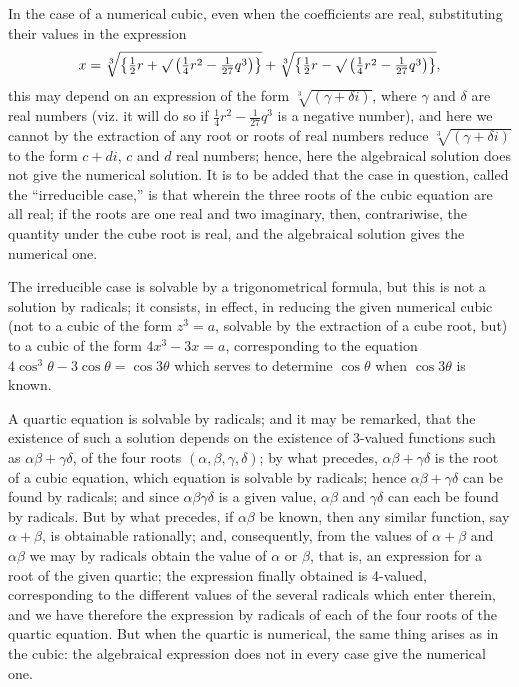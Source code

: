 \documentclass[11pt,a4paper]{book}
\begin{document}
In the case of a numerical cubic, even when the coefficients are real, substituting their values in the expression
\[
x = \sqrt[3]{\left\{\tfrac{1}{2}r + \surd\left(\tfrac{1}{4}r^2 - \tfrac{1}{27}q^3\right)\right\}} + \sqrt[3]{\left\{\tfrac{1}{2}r - \surd\left(\tfrac{1}{4}r^2 - \tfrac{1}{27}q^3\right)\right\}},
\]
this may depend on an expression of the form $\sqrt[3]{(\gamma + \delta i)}$, where $\gamma$ and $\delta$ are real numbers (viz. it will do so if $\frac{1}{4}r^2 - \frac{1}{27}q^3$ is a negative number), and here we cannot by the extraction of any root or roots of real numbers reduce $\sqrt[3]{(\gamma + \delta i)}$ to the form $c + di$, $c$ and $d$ real numbers; hence, here the algebraical solution does not give the numerical solution. It is to be added that the case in question, called the ``irreducible case,'' is that wherein the three roots of the cubic equation are all real; if the roots are one real and two imaginary, then, contrariwise, the quantity under the cube root is real, and the algebraical solution gives the numerical one.

The irreducible case is solvable by a trigonometrical formula, but this is not a solution by radicals; it consists, in effect, in reducing the given numerical cubic (not to a cubic of the form $z^3 = a$, solvable by the extraction of a cube root, but) to a cubic of the form $4x^3 - 3x = a$, corresponding to the equation $4\cos^3\theta - 3\cos\theta = \cos 3\theta$ which serves to determine $\cos\theta$ when $\cos 3\theta$ is known.

A quartic equation is solvable by radicals; and it may be remarked, that the existence of such a solution depends on the existence of 3-valued functions such as $\alpha\beta + \gamma\delta$, of the four roots $(\alpha, \beta, \gamma, \delta)$; by what precedes, $\alpha\beta + \gamma\delta$ is the root of a cubic equation, which equation is solvable by radicals; hence $\alpha\beta + \gamma\delta$ can be found by radicals; and since $\alpha\beta\gamma\delta$ is a given value, $\alpha\beta$ and $\gamma\delta$ can each be found by radicals. But by what precedes, if $\alpha\beta$ be known, then any similar function, say $\alpha + \beta$, is obtainable rationally; and, consequently, from the values of $\alpha + \beta$ and $\alpha\beta$ we may by radicals obtain the value of $\alpha$ or $\beta$, that is, an expression for a root of the given quartic; the expression finally obtained is 4-valued, corresponding to the different values of the several radicals which enter therein, and we have therefore the expression by radicals of each of the four roots of the quartic equation. But when the quartic is numerical, the same thing arises as in the cubic: the algebraical expression does not in every case give the numerical one.
\end{document}
